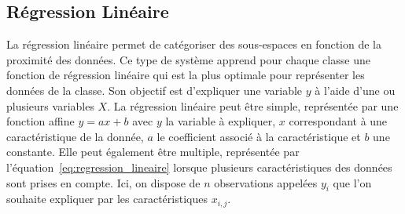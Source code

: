 %
%

\subsection{Régression Linéaire}
La régression linéaire permet de catégoriser des sous-espaces en fonction de la proximité des données. %
Ce type de système apprend pour chaque classe une fonction de régression linéaire qui est la plus optimale pour représenter les données de la classe. Son objectif est d'expliquer une variable $y$ à l'aide d'une ou plusieurs variables $X$. La régression linéaire peut être simple, représentée par une fonction affine $y=ax+b$ avec $y$ la variable à expliquer, $x$ correspondant à une caractéristique de la donnée, $a$ le coefficient associé à la caractéristique et $b$ une constante.
Elle peut également être multiple, représentée par l'équation~\ref{eq:regression_lineaire} lorsque plusieurs caractéristiques des données sont prises en compte. Ici, on dispose de $n$ observations appelées $y_i$ que l'on souhaite expliquer par les caractéristiques $x_{i,j}$.

